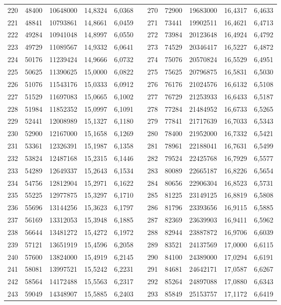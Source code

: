 \begin{longtable}{rrrrrrrrrrr}
220&48400&10648000&14,8324&6,0368&&270&72900&19683000&16,4317&6,4633\\
221&48841&10793861&14,8661&6,0459&&271&73441&19902511&16,4621&6,4713\\
222&49284&10941048&14,8997&6,0550&&272&73984&20123648&16,4924&6,4792\\
223&49729&11089567&14,9332&6,0641&&273&74529&20346417&16,5227&6,4872\\
224&50176&11239424&14,9666&6,0732&&274&75076&20570824&16,5529&6,4951\\
225&50625&11390625&15,0000&6,0822&&275&75625&20796875&16,5831&6,5030\\
226&51076&11543176&15,0333&6,0912&&276&76176&21024576&16,6132&6,5108\\
227&51529&11697083&15,0665&6,1002&&277&76729&21253933&16,6433&6,5187\\
228&51984&11852352&15,0997&6,1091&&278&77284&21484952&16,6733&6,5265\\
229&52441&12008989&15,1327&6,1180&&279&77841&21717639&16,7033&6,5343\\
230&52900&12167000&15,1658&6,1269&&280&78400&21952000&16,7332&6,5421\\
231&53361&12326391&15,1987&6,1358&&281&78961&22188041&16,7631&6,5499\\
232&53824&12487168&15,2315&6,1446&&282&79524&22425768&16,7929&6,5577\\
233&54289&12649337&15,2643&6,1534&&283&80089&22665187&16,8226&6,5654\\
234&54756&12812904&15,2971&6,1622&&284&80656&22906304&16,8523&6,5731\\
235&55225&12977875&15,3297&6,1710&&285&81225&23149125&16,8819&6,5808\\
236&55696&13144256&15,3623&6,1797&&286&81796&23393656&16,9115&6,5885\\
237&56169&13312053&15,3948&6,1885&&287&82369&23639903&16,9411&6,5962\\
238&56644&13481272&15,4272&6,1972&&288&82944&23887872&16,9706&6,6039\\
239&57121&13651919&15,4596&6,2058&&289&83521&24137569&17,0000&6,6115\\
240&57600&13824000&15,4919&6,2145&&290&84100&24389000&17,0294&6,6191\\
241&58081&13997521&15,5242&6,2231&&291&84681&24642171&17,0587&6,6267\\
242&58564&14172488&15,5563&6,2317&&292&85264&24897088&17,0880&6,6343\\
243&59049&14348907&15,5885&6,2403&&293&85849&25153757&17,1172&6,6419\\

\end{longtable}
